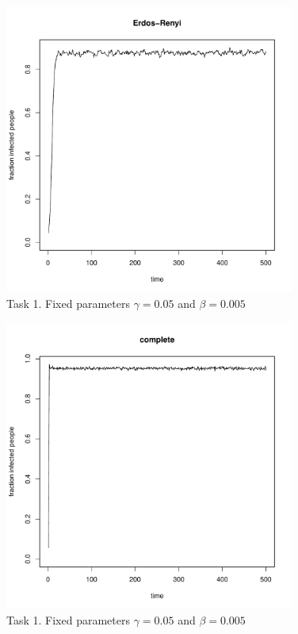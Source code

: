 \documentclass[paper=a4, fontsize=11pt]{scrartcl} %
\begin{document}
\begin{figure}[h] %
   \centering
   \includegraphics[width=0.85\textwidth]{task1_Erdos-Renyi} 
\caption{Task 1. Fixed parameters $\gamma=0.05$ and $\beta=0.005$}
   \label{task1_erdosrenyi}
\end{figure}
\begin{figure}[h] %
   \centering
   \includegraphics[width=0.85\textwidth]{task1_complete} 
\caption{Task 1. Fixed parameters $\gamma=0.05$ and $\beta=0.005$}
   \label{task1_complete}
\end{figure}
\end{document}
